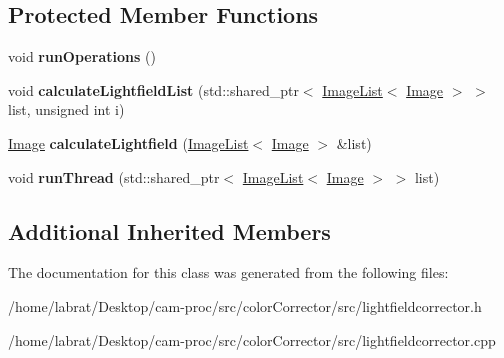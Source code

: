 \subsection*{Protected Member Functions}
\begin{DoxyCompactItemize}
\item 
void {\bfseries run\+Operations} ()\hypertarget{classLightfieldCorrector_ab3454d4370a7a6ccf5adaeecf585762d}{}\label{classLightfieldCorrector_ab3454d4370a7a6ccf5adaeecf585762d}

\item 
void {\bfseries calculate\+Lightfield\+List} (std\+::shared\+\_\+ptr$<$ \hyperlink{classImageList}{Image\+List}$<$ \hyperlink{classImage}{Image} $>$ $>$ list, unsigned int i)\hypertarget{classLightfieldCorrector_abdcad14f0dff4627f45f3634759a1a6d}{}\label{classLightfieldCorrector_abdcad14f0dff4627f45f3634759a1a6d}

\item 
\hyperlink{classImage}{Image} {\bfseries calculate\+Lightfield} (\hyperlink{classImageList}{Image\+List}$<$ \hyperlink{classImage}{Image} $>$ \&list)\hypertarget{classLightfieldCorrector_a2d534d2f6f426ef9b3ff81e3b2db64d0}{}\label{classLightfieldCorrector_a2d534d2f6f426ef9b3ff81e3b2db64d0}

\item 
void {\bfseries run\+Thread} (std\+::shared\+\_\+ptr$<$ \hyperlink{classImageList}{Image\+List}$<$ \hyperlink{classImage}{Image} $>$ $>$ list)\hypertarget{classLightfieldCorrector_a9d518d89298053ce0b7a67d1ea541fb8}{}\label{classLightfieldCorrector_a9d518d89298053ce0b7a67d1ea541fb8}

\end{DoxyCompactItemize}
\subsection*{Additional Inherited Members}


The documentation for this class was generated from the following files\+:\begin{DoxyCompactItemize}
\item 
/home/labrat/\+Desktop/cam-\/proc/src/color\+Corrector/src/lightfieldcorrector.\+h\item 
/home/labrat/\+Desktop/cam-\/proc/src/color\+Corrector/src/lightfieldcorrector.\+cpp\end{DoxyCompactItemize}
